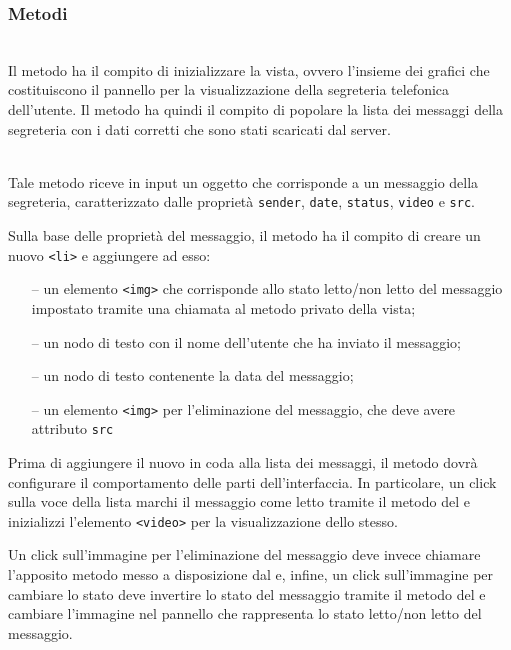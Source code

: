 \subsubsection*{Metodi}
\begin{description}
  \item{}\\
  Il metodo ha il compito di inizializzare la vista, ovvero l'insieme dei  grafici che costituiscono il pannello per la visualizzazione della segreteria telefonica dell'utente. Il metodo ha quindi il compito di popolare la lista dei messaggi della segreteria con i dati corretti che sono stati scaricati dal server.
  
  \item{}\\
  Tale metodo riceve in input un oggetto che corrisponde a un messaggio della segreteria, caratterizzato dalle proprietà \verb'sender', \verb'date', \verb'status', \verb'video' e \verb'src'.
  
  Sulla base delle proprietà del messaggio, il metodo ha il compito di creare un nuovo \verb'<li>' e aggiungere ad esso:
  \begin{itemize}
    \item[--] un elemento \verb'<img>' che corrisponde allo stato letto/non letto del messaggio impostato tramite una chiamata al metodo privato  della vista;
    \item[--] un nodo di testo con il nome dell'utente che ha inviato il messaggio;
    \item[--] un nodo di testo contenente la data del messaggio;
    \item[--] un elemento \verb'<img>' per l'eliminazione del messaggio, che deve avere attributo \verb'src'
  \end{itemize}
  
  Prima di aggiungere il nuovo  in coda alla lista dei messaggi, il metodo dovrà configurare il comportamento delle parti dell'interfaccia. In particolare, un click sulla voce della lista marchi il messaggio come letto tramite il metodo  del  e inizializzi l'elemento \verb'<video>' per la visualizzazione dello stesso.
  
  Un click sull'immagine per l'eliminazione del messaggio deve invece chiamare l'apposito metodo  messo a disposizione dal  e, infine, un click sull'immagine per cambiare lo stato deve invertire lo stato del messaggio tramite il metodo  del  e cambiare l'immagine nel pannello che rappresenta lo stato letto/non letto del messaggio.
  

\end{description}
